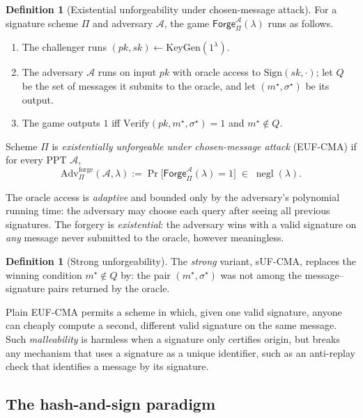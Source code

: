 \documentclass[11pt,a4paper]{article}
\theoremstyle{definition}
\newtheorem{definition}[theorem]{Definition}
\theoremstyle{remark}
\DeclareMathOperator{\negl}{negl}
\begin{document}
\begin{definition}[Existential unforgeability under chosen-message
attack]\label{signatures:def:eufcma}
For a signature scheme \(\Pi\) and adversary \(\mathcal A\), the game
\(\mathsf{Forge}^{\mathcal A}_{\Pi}(\lambda)\) runs as follows.
\begin{enumerate}
\item The challenger runs
  \((pk, sk) \gets \mathrm{KeyGen}(1^{\lambda})\).
\item The adversary \(\mathcal A\) runs on input \(pk\) with oracle
  access to \(\mathrm{Sign}(sk, \cdot)\); let \(Q\) be the set of
  messages it submits to the oracle, and let
  \((m^{\star}, \sigma^{\star})\) be its output.
\item The game outputs \(1\) iff
  \(\mathrm{Verify}(pk, m^{\star}, \sigma^{\star}) = 1\) and
  \(m^{\star} \notin Q\).
\end{enumerate}
Scheme \(\Pi\) is \emph{existentially unforgeable under
chosen-message attack} (EUF-CMA) if for every PPT \(\mathcal A\),
\[
\mathrm{Adv}^{\mathrm{forge}}_{\Pi}(\mathcal A, \lambda)
:= \Pr\bigl[\mathsf{Forge}^{\mathcal A}_{\Pi}(\lambda) = 1\bigr]
\;\in\; \negl(\lambda).
\]
\end{definition}

The oracle access is \emph{adaptive} and bounded only by the
adversary's polynomial running time: the adversary may choose each
query after seeing all previous signatures. The forgery is
\emph{existential}: the adversary wins with a valid signature on
\emph{any} message never submitted to the oracle, however meaningless.

\begin{definition}[Strong unforgeability]\label{signatures:def:sufcma}
The \emph{strong} variant, sUF-CMA, replaces the winning condition
\(m^{\star} \notin Q\) by: the pair \((m^{\star}, \sigma^{\star})\)
was not among the message--signature pairs returned by the oracle.
\end{definition}

Plain EUF-CMA permits a scheme in which, given one valid signature,
anyone can cheaply compute a second, different valid signature on the
same message. Such \emph{malleability} is harmless when a signature
only certifies origin, but breaks any mechanism that uses a signature
as a unique identifier, such as an anti-replay check that identifies a
message by its signature.

\subsection{The hash-and-sign paradigm}
\label{signatures:subsec:hashandsign}
\end{document}
